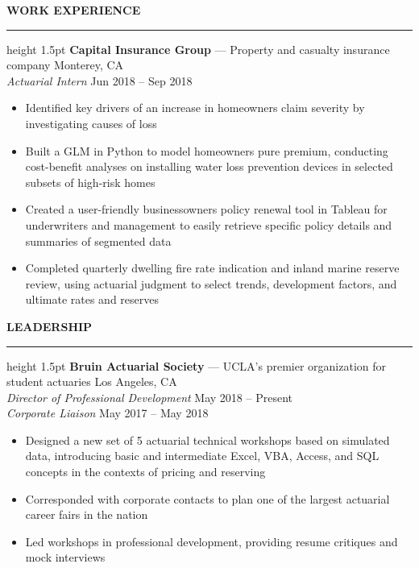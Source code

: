 \documentclass[11pt,letterpaper]{article}
\newcommand{\sectline}{\vspace{4pt}\hrule height 1.5pt\vspace{4pt}}
\newcommand{\sectspace}{\vspace{8pt}}
\newcommand{\smallspace}{\vspace{4pt}}
\begin{document}
\textbf{WORK EXPERIENCE}\sectline
\textbf{Capital Insurance Group} --- Property and casualty insurance company \hfill Monterey, CA \\
\textit{Actuarial Intern} \hfill Jun 2018 -- Sep 2018 
\begin{itemize}
	\item Identified key drivers of an increase in homeowners claim severity by investigating causes of loss
	\item Built a GLM in Python to model homeowners pure premium, conducting cost-benefit analyses on installing water loss prevention devices in selected subsets of high-risk homes 
	\item Created a user-friendly businessowners policy renewal tool in Tableau for underwriters and management to easily retrieve specific policy details and summaries of segmented data
	\item Completed quarterly dwelling fire rate indication and inland marine reserve review, using actuarial judgment to select trends, development factors, and ultimate rates and reserves
\end{itemize}
\sectspace


\textbf{LEADERSHIP} \sectline
\textbf{Bruin Actuarial Society} --- UCLA's premier organization for student actuaries \hfill Los Angeles, CA \\
\textit{Director of Professional Development} \hfill May 2018 -- Present \\
\textit{Corporate Liaison} \hfill May 2017 -- May 2018
\begin{itemize}
	\item Designed a new set of 5 actuarial technical workshops based on simulated data, introducing basic and intermediate Excel, VBA, Access, and SQL concepts in the contexts of pricing and reserving
	\item Corresponded with corporate contacts to plan one of the largest actuarial career fairs in the nation
	\item Led workshops in professional development, providing resume critiques and mock interviews
\end{itemize}
\sectspace
\end{document}
